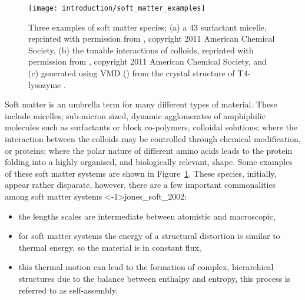 %
\begin{figure}[b]
    \centering
    \texttt{[image: introduction/soft\_matter\_examples]}
    \caption{Three examples of soft matter species; (a) a 43  surfactant micelle, reprinted with permission from \cite{hargreaves_atomistic_2011}, copyright 2011 American Chemical Society, (b) the tunable interactions of colloids, reprinted with permission from \cite{kraft_patchy_2011}, copyright 2011 American Chemical Society, and (c) generated using VMD (\cite{humphrey_vmd_1996}) from the crystal structure of T4-lysozyme \cite{rose_crystal_1988}.}
    \label{fig:soft}
\end{figure}
%
Soft matter is an umbrella term for many different types of material.
These include micelles; sub-micron sized, dynamic agglomerates of amphiphilic molecules such as surfactants or block co-polymers, colloidal solutions; where the interaction between the colloids may be controlled through chemical modification, or proteins; where the polar nature of different amino acids leads to the protein folding into a highly organised, and biologically relevant, shape.
Some examples of these soft matter systems are shown in Figure~\ref{fig:soft}.
These species, initially, appear rather disparate, however, there are a few important commonalities among soft matter systems \sidecite<-1\baselineskip>{jones_soft_2002}:
\begin{itemize}
  \item the lengths scales are intermediate between atomistic and macroscopic,
  \item for soft matter systems the energy of a structural distortion is similar to thermal energy, so the material is in constant flux,
  \item this thermal motion can lead to the formation of complex, hierarchical structures due to the balance between enthalpy and entropy, this process is referred to as self-assembly.
\end{itemize}

